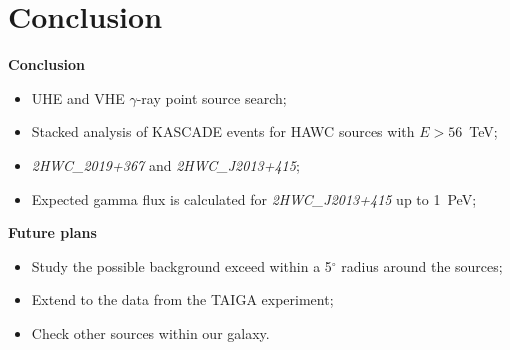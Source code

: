 \section{Conclusion}

\begin{frame}
\textcolor{kit-green100}{\textbf{Conclusion}}
\begin{itemize}
  \item UHE and VHE $\gamma$-ray point source search;
  \item Stacked analysis of KASCADE events for HAWC sources with $E > 56$~TeV;
  \item \textit{2HWC\_2019+367} and \textit{2HWC\_J2013+415};
  \item Expected gamma flux is calculated for \textit{2HWC\_J2013+415} up to 1~PeV;



\end{itemize}

\textcolor{kit-green100}{\textbf{Future plans}}
  \begin{itemize}
    \item Study the possible background exceed within a 5$^\circ$ radius around the sources;
    \item Extend to the data from the TAIGA experiment;
    \item Check other sources within our galaxy.
  \end{itemize}
\end{frame}

